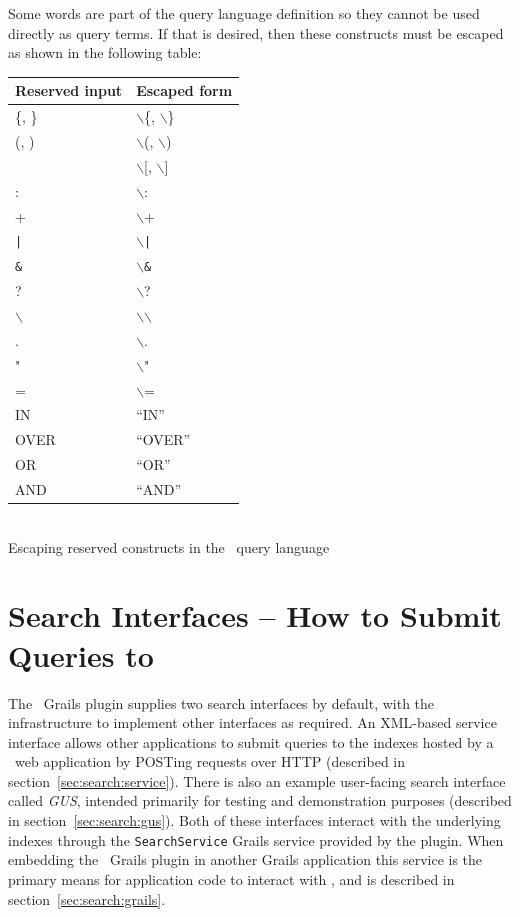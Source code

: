 Some words are part of the query language definition so they cannot be used
directly as query terms. If that is desired, then these constructs must be
escaped as shown in the following table:
\begin{center}
\begin{tabular}{|l|l|}
\hline
{\bf Reserved input} & {\bf Escaped form}\\
\hline \hline
\{, \} &  $\backslash$\{, $\backslash$\}\\
\hline
(, )  & $\backslash$(, $\backslash$) \\
\hline
[, ] & $\backslash$[, $\backslash$]\\
\hline
: &  $\backslash$: \\
\hline
+ &  $\backslash$+ \\
\hline
{\tt |} &  $\backslash${\tt |} \\
\hline
{\tt \&} &  $\backslash${\tt \&} \\
\hline
? &  $\backslash$? \\
\hline
$\backslash$ &  $\backslash$$\backslash$ \\
\hline
. &  $\backslash$. \\
\hline
" &  $\backslash$" \\
\hline 
=  & $\backslash$= \\
\hline
IN & ``IN'' \\
\hline
OVER & ``OVER''\\ 
\hline
OR & ``OR''\\ 
\hline
AND & ``AND''\\ 
\hline
\end{tabular}\\
\vspace{1ex}
Escaping reserved constructs in the \Mimir\ query language
\end{center}


\section{Search Interfaces -- How to Submit Queries to \Mimir}
\label{sec:search:interfaces}

The \Mimir\ Grails plugin supplies two search interfaces by default, with the
infrastructure to implement other interfaces as required.  An XML-based service
interface allows other applications to submit queries to the indexes hosted by
a \Mimir\ web application by POSTing requests over HTTP (described in
section~\ref{sec:search:service}).  There is also an example user-facing search
interface called {\em GUS}, intended primarily for testing and demonstration
purposes (described in section~\ref{sec:search:gus}).  Both of these interfaces
interact with the underlying indexes through the {\tt SearchService} Grails
service provided by the plugin.  When embedding the \Mimir\ Grails plugin in
another Grails application this service is the primary means for application
code to interact with \Mimir, and is described in
section~\ref{sec:search:grails}.

